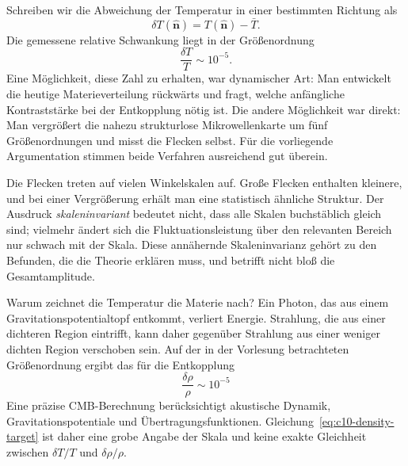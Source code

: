 Schreiben wir die Abweichung der Temperatur in einer bestimmten Richtung als
\[
\delta T(\hat{\mathbf n})=T(\hat{\mathbf n})-\bar T.
\]
Die gemessene relative Schwankung liegt in der Größenordnung
\begin{equation}
\frac{\delta T}{T}\sim10^{-5}.
\label{eq:c10-cmb-anisotropy}
\end{equation}
Eine Möglichkeit, diese Zahl zu erhalten, war dynamischer Art: Man entwickelt die heutige Materieverteilung rückwärts und fragt, welche anfängliche Kontraststärke bei der Entkopplung nötig ist. Die andere Möglichkeit war direkt: Man vergrößert die nahezu strukturlose Mikrowellenkarte um fünf Größenordnungen und misst die Flecken selbst. Für die vorliegende Argumentation stimmen beide Verfahren ausreichend gut überein.

Die Flecken treten auf vielen Winkelskalen auf. Große Flecken enthalten kleinere, und bei einer Vergrößerung erhält man eine statistisch ähnliche Struktur. Der Ausdruck \emph{skaleninvariant} bedeutet nicht, dass alle Skalen buchstäblich gleich sind; vielmehr ändert sich die Fluktuationsleistung über den relevanten Bereich nur schwach mit der Skala. Diese annähernde Skaleninvarianz gehört zu den Befunden, die die Theorie erklären muss, und betrifft nicht bloß die Gesamtamplitude.

Warum zeichnet die Temperatur die Materie nach? Ein Photon, das aus einem Gravitationspotentialtopf entkommt, verliert Energie. Strahlung, die aus einer dichteren Region eintrifft, kann daher gegenüber Strahlung aus einer weniger dichten Region verschoben sein. Auf der in der Vorlesung betrachteten Größenordnung ergibt das für die Entkopplung
\begin{equation}
\frac{\delta\rho}{\rho}\sim10^{-5}
\label{eq:c10-density-target}
\end{equation}
Eine präzise CMB-Berechnung berücksichtigt akustische Dynamik, Gravitationspotentiale und Übertragungsfunktionen. Gleichung~\eqref{eq:c10-density-target} ist daher eine grobe Angabe der Skala und keine exakte Gleichheit zwischen \(\delta T/T\) und \(\delta\rho/\rho\).

\begin{classroomqa}
\end{classroomqa}

